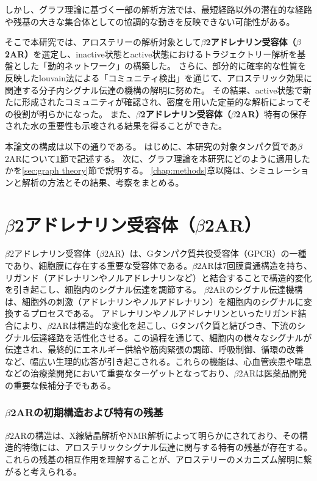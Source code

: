 しかし、グラフ理論に基づく一部の解析方法では、最短経路以外の潜在的な経路や残基の大きな集合体としての協調的な動きを反映できない可能性がある。

そこで本研究では、アロステリーの解析対象として\textbf{$\beta$2アドレナリン受容体（$\beta$2AR）}を選定し、inactive状態とactive状態におけるトラジェクトリー解析を基盤とした「動的ネットワーク」の構築した。
さらに、部分的に確率的な性質を反映したlouvain法による「コミュニティ検出」を通じて、アロステリック効果に関連する分子内シグナル伝達の機構の解明に努めた。
その結果、active状態で新たに形成されたコミュニティが確認され、密度を用いた定量的な解析によってその役割が明らかになった。
また、\textbf{$\beta$2アドレナリン受容体（$\beta$2AR）}特有の保存された水の重要性も示唆される結果を得ることができた。

本論文の構成は以下の通りである。
はじめに、本研究の対象タンパク質であ$\beta$2ARについて\ref{sec:b2ar}節で記述する。
次に、グラフ理論を本研究にどのように適用したかを\ref{sec:graph theory}節で説明する。
\ref{chap:methods}章以降は、シミュレーションと解析の方法とその結果、考察をまとめる。

\newpage

\section{$\beta$2アドレナリン受容体（$\beta$2AR）}\label{sec:b2ar}
$\beta$2アドレナリン受容体（$\beta$2AR）は、Gタンパク質共役受容体（GPCR）の一種であり、細胞膜に存在する重要な受容体である。$\beta$2ARは7回膜貫通構造を持ち、リガンド（アドレナリンやノルアドレナリンなど）と結合することで構造的変化を引き起こし、細胞内のシグナル伝達を調節する。
$\beta$2ARのシグナル伝達機構は、細胞外の刺激（アドレナリンやノルアドレナリン）を細胞内のシグナルに変換するプロセスである。
アドレナリンやノルアドレナリンといったリガンド結合により、$\beta$2ARは構造的な変化を起こし、Gタンパク質と結びつき、下流のシグナル伝達経路を活性化させる。この過程を通じて、細胞内の様々なシグナルが伝達され、最終的にエネルギー供給や筋肉緊張の調節、呼吸制御、循環の改善など、幅広い生理的応答が引き起こされる。これらの機能は、心血管疾患や喘息などの治療薬開発において重要なターゲットとなっており、$\beta$2ARは医薬品開発の重要な候補分子でもある。

\subsubsection*{$\beta$2ARの初期構造および特有の残基} 
$\beta$2ARの構造は、X線結晶解析やNMR解析によって明らかにされており、その構造的特徴には、アロステリックシグナル伝達に関与する特有の残基が存在する。これらの残基の相互作用を理解することが、アロステリーのメカニズム解明に繋がると考えられる。
